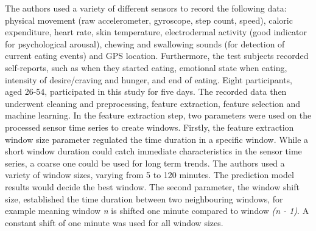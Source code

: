 The authors used a variety of different sensors to record the following data: physical movement (raw accelerometer, gyroscope, step count, speed), caloric expenditure, heart rate, skin temperature, electrodermal activity (good indicator for psychological arousal), chewing and swallowing sounds (for detection of current eating events) and GPS location. Furthermore, the test subjects recorded self-reports, such as when they started eating, emotional state when eating, intensity of desire/craving and hunger, and end of eating. Eight participants, aged 26-54, participated in this study for five days. The recorded data then underwent cleaning and preprocessing, feature extraction, feature selection and machine learning. 
In the feature extraction step, two parameters were used on the processed sensor time series to create windows. Firstly, the feature extraction window size parameter regulated the time duration in a specific window. While a short window duration could catch immediate characteristics in the sensor time series, a coarse one could be used for long term trends. The authors used a variety of window sizes, varying from 5 to 120 minutes. The prediction model results would decide the best window. The second parameter, the window shift size, established the time duration between two neighbouring windows, for example meaning window \textit{n} is shifted one minute compared to window \textit{(n - 1)}. A constant shift of one minute was used for all window sizes. 

